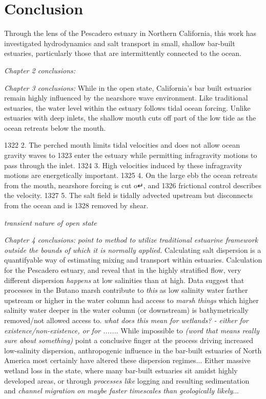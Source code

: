 \chapter{Conclusion}
\label{conclusion}

Through the lens of the Pescadero estuary in Northern California, this work has investigated hydrodynamics and salt transport in small, shallow bar-built estuaries, particularly those that are intermittently connected to the ocean. 

\emph{Chapter 2 conclusions:}

\emph{Chapter 3 conclusions:}
While in the open state, California's bar built estuaries remain highly influenced by the nearshore wave environment. Like traditional estuaries, the water level within the estuary follows tidal ocean forcing. Unlike estuaries with deep inlets, the shallow mouth cuts off part of the low tide as the ocean retreats below the mouth. 


1322 2. The perched mouth limits tidal velocities and does not allow ocean gravity waves to
1323 enter the estuary while permitting infragravity motions to pass through the inlet.
1324 3. High velocities induced by these infragravity motions are energetically important.
1325 4. On the large ebb the ocean retreats from the mouth, nearshore forcing is cut o↵, and
1326 frictional control describes the velocity.
1327 5. The salt field is tidally advected upstream but disconnects from the ocean and is
1328 removed by shear.

\emph{transient nature of open state}


\emph{Chapter 4 conclusions:} \emph{point to method to utilize traditional estuarine framework outside the bounds of which it is normally applied.}
Calculating salt dispersion is a quantifyable way of estimating mixing and transport within estuaries. Calculation for the Pescadero estuary, and reveal that in the highly stratified flow, very different dispersion \emph{happens} at low salinities than at high. Data suggest that processes in the Butano marsh contribute to \emph{this} as low salinity water farther upstream or higher in the water column had access to \emph{marsh things} which higher salinity water deeper in the water column (or downstream) is bathymetrically removed/not allowed access to.  \emph{what does this mean for wetlands? - either for existence/non-existence, or for ......}.  While impossible to \emph{(word that means really sure about something)} point a conclusive finger at the process driving increased low-salinity dispersion, anthropogenic influence in the bar-built estuaries of North America most certainly have altered these dispersion regimes... Either massive wetland loss in the state, where many bar-built estuaries sit amidst highly developed areas, or through \emph{processes like} logging and resulting sedimentation and \emph{channel migration on maybe faster timescales than geologically likely}... 

